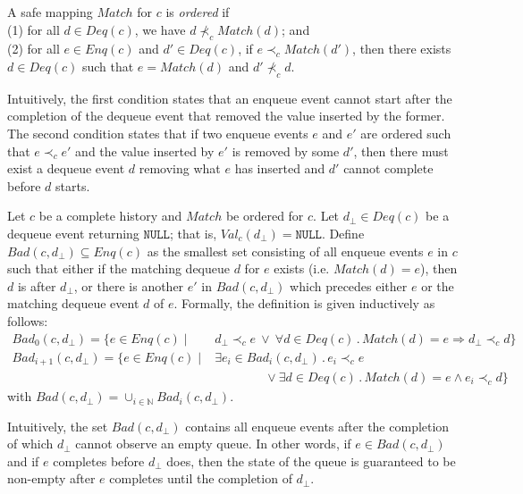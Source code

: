 \documentclass{LMCS}
\newcommand{\COMMENT}[1]{}
\newcommand{\NULL}{\ensuremath{\mathtt{NULL}}}
\newcommand{\Match}{\ensuremath{\mathit{Match}}}
\newcommand{\Deq}[1]{\ensuremath{\mathit{Deq}({#1})}}
\newcommand{\Enq}[1]{\ensuremath{\mathit{Enq}({#1})}}
\newcommand{\After}[2]{\ensuremath{\mathit{After}({#1},{#2})}}
\newcommand{\Val}[2]{\ensuremath{\mathit{Val}_{#1}({#2})}}
\newcommand{\Bad}[2]{\ensuremath{\mathit{Bad}(#1,#2)}}
\newcommand{\Badx}[3]{\ensuremath{\mathit{Bad}_{#3}(#1,#2)}}
\newcommand{\dhat}{\ensuremath{d_{\bot}}}
\newcommand\mylabel[1]{\label{#1}}
\begin{document}
\begin{defi}\mylabel{def:ordered}
A safe mapping $\Match$ for $c$ is {\em ordered} if \\
(1) for all $d\in \Deq c$, we have $d\not\prec_c \Match(d)$; and\\
(2) for all $e\in \Enq c$ and $d'\in \Deq c$, if $e\prec_c \Match(d')$, 
then there exists \mbox{$d\in \Deq c$} such that $e=\Match(d)$ and $d' \not\prec_c d$.
\end{defi}
Intuitively, the first condition states that an enqueue event cannot start after the completion of the dequeue event that removed the value inserted by the former.
The second condition states that if two enqueue events $e$ and $e'$ are ordered such that $e\prec_c e'$ and the value inserted by $e'$ is removed by some $d'$, then there must exist a dequeue event $d$ removing what $e$ has inserted and $d'$ cannot complete before $d$ starts.

Let $c$ be a complete history and $\Match$ be ordered for $c$.
Let $d_{\bot}\in \Deq c$ be a dequeue event returning {\NULL}; that is, $\Val c {d_{\bot}}=\NULL$. 
Define $\Bad c {d_{\bot}}\subseteq \Enq c$ as the smallest set consisting of all enqueue events $e$ in $c$ such that either if the matching dequeue $d$ for $e$ exists (i.e. $\Match(d)=e$), then $d$ is after $d_{\bot}$, or there is another $e'$ in $\Bad c {d_{\bot}}$ which precedes either $e$ or the matching dequeue event $d$ of $e$.
Formally, the definition is given inductively as follows:
\begin{align*}
\Badx c {\dhat} 0  = \{ e \in \Enq c \mid{} &
	\dhat \prec_c e ~\lor~ \forall d\in \Deq c\,.\, \Match(d)=e \Rightarrow \dhat \prec_c d\}\\
\Badx c {\dhat} {i+1} = \{ e \in \Enq c \mid{} &
	\exists e_i\in \Badx c {\dhat} i\,.\, e_i\prec_c e\\
& \qquad\qquad \lor \exists d\in \Deq c\,.\, \Match(d)=e \wedge e_i\prec_c d\}
\end{align*}
with
$
\Bad c {\dhat} = \cup_{i\in\mathbb{N}} \Badx c {\dhat} i 
$.

Intuitively, the set $\Bad c {d_{\bot}}$ contains all enqueue events after the completion of which $d_{\bot}$ cannot observe an empty queue.
In other words, if $e\in \Bad c {d_{\bot}}$ and if $e$ completes before $d_{\bot}$ does, then the state of the queue is guaranteed to be non-empty after $e$ completes until the completion of $d_{\bot}$. 

\COMMENT{
$e'\in \Enq c \cap \overline{\After c d}$ such that either there does not exist a $d'\in \Deq c$ such that $\Match(d')=e'$ or $d'$ exists and one of the following holds:
\begin{enumerate}
\item $d\prec_c d'$.
\item there exists $e''\in \Bad c d$ such that either $e''\prec_c e'$ or $e''\prec_c d'$.
\end{enumerate}
An equivalent definition given inductively is as follows:
}
\end{document}

